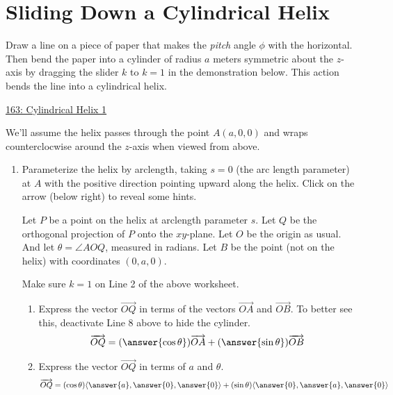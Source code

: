 \documentclass{ximera}
\begin{document}
\section{Sliding Down a Cylindrical Helix}
\begin{question}  \label{Qdef54356452}
Draw a line on a piece of paper that makes the \emph{pitch} angle $\phi$ with the horizontal. Then bend the paper into a cylinder of radius $a$ meters symmetric about the $z$-axis by dragging the slider $k$ to $k=1$ in the demonstration below. This action bends the line into a cylindrical helix.

\begin{onlineOnly}
    \begin{center}
\end{center}
\end{onlineOnly}

\href{https://www.desmos.com/3d/vrrpxfddv2}{163: Cylindrical Helix 1}

We'll assume the helix passes through the point $A(a,0,0)$ and wraps counterclocwise around the $z$-axis when viewed from above. 

\begin{enumerate}
\item  Parameterize the helix by arclength, taking $s=0$ (the arc length parameter) at $A$ with the positive direction pointing upward along the helix. Click on the arrow (below right) to reveal some hints.

\begin{expandable}
Let $P$ be a point on the helix at arclength parameter $s$. Let $Q$ be the orthogonal projection of $P$ onto the $xy$-plane.
Let $O$ be the origin as usual. And let $\theta = \angle AOQ$, measured in radians.
Let $B$ be the point (not on the helix) with coordinates $(0,a,0)$.

Make sure $k=1$ on Line 2 of the above worksheet.

\begin{enumerate}
\item Express the vector $\overrightarrow{OQ}$ in terms of the vectors $\overrightarrow{OA}$ and $\overrightarrow{OB}$. To better see this, deactivate Line 8 above to hide the cylinder.
\[
   \overrightarrow{OQ} = (\answer{\cos\theta})\overrightarrow{OA} + (\answer{\sin\theta})\overrightarrow{OB}
\]

\item Express the vector $\overrightarrow{OQ}$ in terms of $a$ and $\theta$. %
\[
    \overrightarrow{OQ} = (\cos\theta)\langle \answer{a},\answer{0},\answer{0} \rangle + (\sin\theta)\langle \answer{0},\answer{a},\answer{0} \rangle
\]



\end{enumerate}
\end{expandable}
\end{enumerate}
\end{question}
\end{document}

